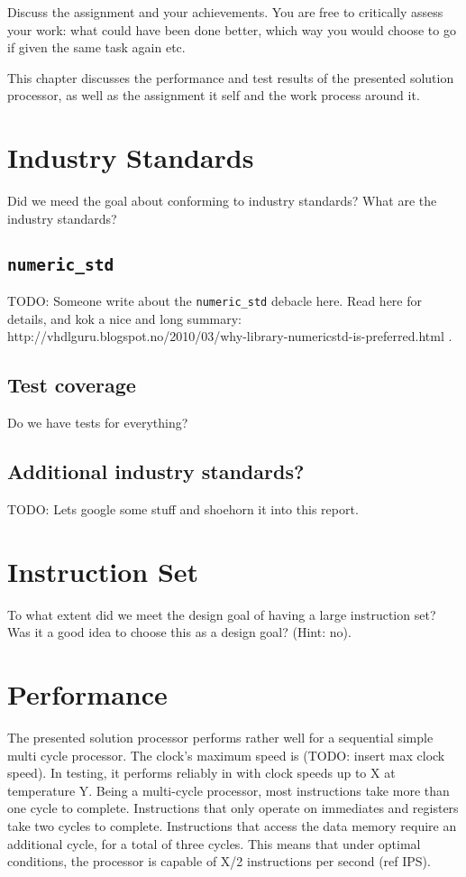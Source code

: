 Discuss the assignment and your achievements.
You are free to critically assess your work:
what could have been done better, which way you would choose to go if given the same task again etc.

This chapter discusses the performance and test results of the presented solution processor, as well as the assignment it self and the work process around it.

\section{Industry Standards}

Did we meed the goal about conforming to industry standards?
What are the industry standards?

\subsection{\texttt{numeric\_std}}

TODO: Someone write about the \texttt{numeric\_std} debacle here.
Read here for details, and kok a nice and long summary: http://vhdlguru.blogspot.no/2010/03/why-library-numericstd-is-preferred.html .

\subsection{Test coverage}

Do we have tests for everything?

\subsection{Additional industry standards?}

TODO: Lets google some stuff and shoehorn it into this report.

\section{Instruction Set}

To what extent did we meet the design goal of having a large instruction set?
Was it a good idea to choose this as a design goal? (Hint: no).

\section{Performance}

The presented solution processor performs rather well for a sequential simple multi cycle processor.
The clock's maximum speed is (TODO: insert max clock speed).
In testing, it performs reliably in with clock speeds up to X at temperature Y.
Being a multi-cycle processor, most instructions take more than one cycle to complete.
Instructions that only operate on immediates and registers take two cycles to complete.
Instructions that access the data memory require an additional cycle, for a total of three cycles.
This means that under optimal conditions, the processor is capable of X/2 instructions per second (ref IPS).

